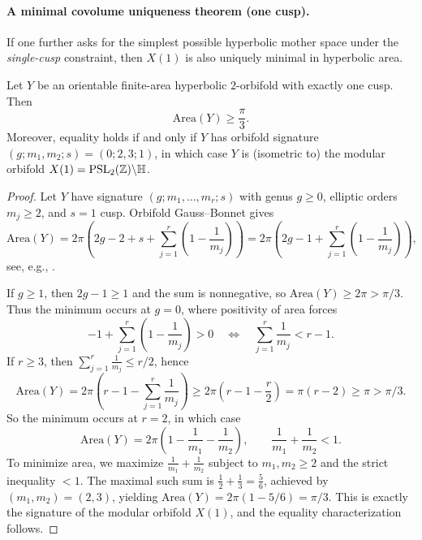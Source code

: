 \paragraph{A minimal covolume uniqueness theorem (one cusp).}
If one further asks for the simplest possible hyperbolic mother space under the \emph{single-cusp} constraint, then $X(1)$ is also uniquely minimal in hyperbolic area.
\begin{proposition}
\label{prop:min_area_one_cusp_orbifold}
Let $Y$ be an orientable finite-area hyperbolic $2$-orbifold with exactly one cusp.
Then
\begin{equation}
\label{eq:min_area_one_cusp}
\mathrm{Area}(Y)\ge \frac{\pi}{3}.
\end{equation}
Moreover, equality holds if and only if $Y$ has orbifold signature $(g; m_1,m_2; s)=(0;2,3;1)$, in which case $Y$ is (isometric to) the modular orbifold $X(1)=\mathrm{PSL}_2(\mathbb{Z})\backslash\mathbb{H}$.
\end{proposition}
\begin{proof}
Let $Y$ have signature $(g; m_1,\ldots,m_r; s)$ with genus $g\ge 0$, elliptic orders $m_j\ge 2$, and $s=1$ cusp.
Orbifold Gauss--Bonnet gives
\begin{equation}
\label{eq:orbifold_area_formula}
\mathrm{Area}(Y)=2\pi\!\left(2g-2+s+\sum_{j=1}^{r}\left(1-\frac{1}{m_j}\right)\right)
=2\pi\!\left(2g-1+\sum_{j=1}^{r}\left(1-\frac{1}{m_j}\right)\right),
\end{equation}
see, e.g., \cite{Ratcliffe1994}.
\par
If $g\ge 1$, then $2g-1\ge 1$ and the sum is nonnegative, so $\mathrm{Area}(Y)\ge 2\pi>\pi/3$.
Thus the minimum occurs at $g=0$, where positivity of area forces
\[
-1+\sum_{j=1}^{r}\left(1-\frac{1}{m_j}\right)>0
\quad\Longleftrightarrow\quad
\sum_{j=1}^{r}\frac{1}{m_j}<r-1.
\]
If $r\ge 3$, then $\sum_{j=1}^{r}\frac{1}{m_j}\le r/2$, hence
\[
\mathrm{Area}(Y)=2\pi\!\left(r-1-\sum_{j=1}^{r}\frac{1}{m_j}\right)\ge 2\pi\!\left(r-1-\frac{r}{2}\right)=\pi(r-2)\ge \pi>\pi/3.
\]
So the minimum occurs at $r=2$, in which case
\[
\mathrm{Area}(Y)=2\pi\!\left(1-\frac{1}{m_1}-\frac{1}{m_2}\right),
\qquad \frac{1}{m_1}+\frac{1}{m_2}<1.
\]
To minimize area, we maximize $\frac{1}{m_1}+\frac{1}{m_2}$ subject to $m_1,m_2\ge 2$ and the strict inequality $<1$.
The maximal such sum is $\frac{1}{2}+\frac{1}{3}=\frac{5}{6}$, achieved by $(m_1,m_2)=(2,3)$, yielding $\mathrm{Area}(Y)=2\pi(1-5/6)=\pi/3$.
This is exactly the signature of the modular orbifold $X(1)$, and the equality characterization follows.
\end{proof}


